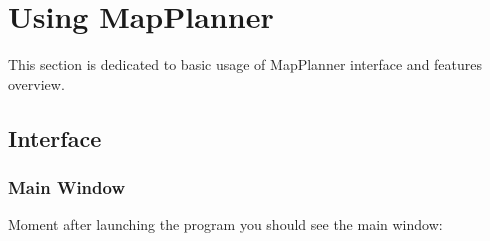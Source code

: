 \section{Using MapPlanner}

This section is dedicated to basic usage of MapPlanner interface and features overview.

	\subsection{Interface}
		
		\subsubsection{Main Window}
			
			Moment after launching the program you should see the main window: